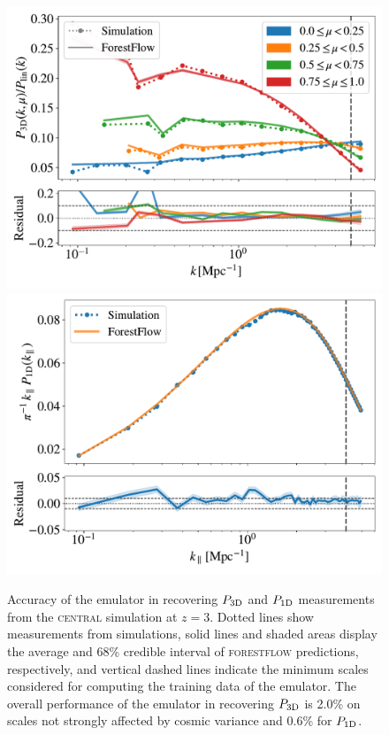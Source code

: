 \documentclass[longauth]{aa}
\newcommand{\poned}{\ensuremath{P_{\rm 1D}}\xspace}
\newcommand{\pthreed}{\ensuremath{P_{\rm 3D}}\xspace}
\newcommand{\forestflow}{\textsc{forestflow}\xspace}
\newcommand{\simcentral}{\textsc{central}\xspace}
\begin{document}
\begin{figure}
\includegraphics[width= 0.95\columnwidth]{figures/p3d_snap.pdf}
\includegraphics[width= 0.97\columnwidth]{figures/p1d_snap.pdf}
\centering
\caption{Accuracy of the emulator in recovering \pthreed and \poned measurements from the \simcentral simulation at $z=3$. Dotted lines show measurements from simulations, solid lines and shaded areas display the average and 68\% credible interval of \forestflow predictions, respectively, and vertical dashed lines indicate the minimum scales considered for computing the training data of the emulator. The overall performance of the emulator in recovering \pthreed is 2.0\% on scales not strongly affected by cosmic variance and 0.6\% for \poned.
}
\label{fig:test_snap}
\end{figure}
\end{document}
